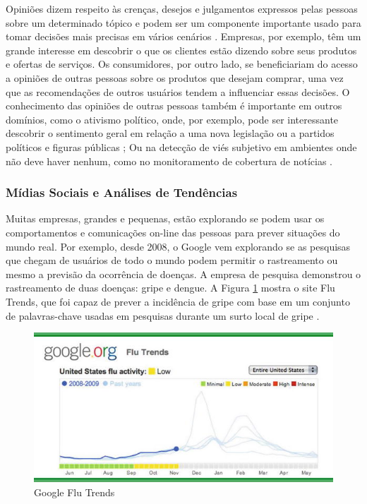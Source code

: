 \documentclass[
	12pt,				%
	openright,			%
	oneside,			%
	a4paper,			%
	english,			%
	spanish,			%
	brazil				%
	]{abntex2}
\begin{document}
	Opiniões dizem respeito às crenças, desejos e julgamentos expressos pelas pessoas sobre um determinado tópico e podem ser um componente importante usado para tomar decisões mais precisas em vários cenários \cite{book_discover_practices}. Empresas, por exemplo, têm um grande interesse em descobrir o que os clientes estão dizendo sobre seus produtos e ofertas de serviços. Os consumidores, por outro lado, se beneficiariam do acesso a opiniões de outras pessoas sobre os produtos que desejam comprar, uma vez que as recomendações de outros usuários tendem a influenciar essas decisões. O conhecimento das opiniões de outras pessoas também é importante em outros domínios, como o ativismo político, onde, por exemplo, pode ser interessante descobrir o sentimento geral em relação a uma nova legislação ou a partidos políticos e figuras públicas \cite{book_political_opinion}; Ou na detecção de viés subjetivo em ambientes onde não deve haver nenhum, como no monitoramento de cobertura de notícias \cite{book_Cambria2015}.

	\subsubsection*{Mídias Sociais e Análises de Tendências}
	Muitas empresas, grandes e pequenas, estão explorando se podem usar os comportamentos e comunicações on-line das pessoas para prever situações do mundo real. Por exemplo, desde 2008, o Google vem explorando se as pesquisas que chegam de usuários de todo o mundo podem permitir o rastreamento ou mesmo a previsão da ocorrência de doenças. A empresa de pesquisa demonstrou o rastreamento de duas doenças: gripe e dengue. A Figura \ref{google_flu} mostra o site Flu Trends, que foi capaz de prever a incidência de gripe com base em um conjunto de palavras-chave usadas em pesquisas durante um surto local de gripe \cite{book_social_machines}.

\begin{figure}[!htb]
\centering
\includegraphics{google_flu}
\caption{Google Flu Trends}
\label{google_flu}
\end{figure}
\end{document}
